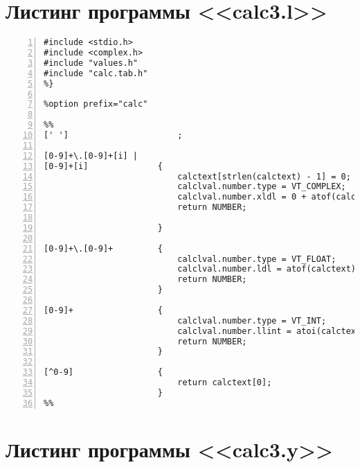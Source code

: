 \documentclass[bachelor, och, coursework, times]{SCWorks}
\begin{document}
\section{Листинг программы <<calc3.l>>}\label{pril-6}

\begin{Verbatim}[fontsize=\small, numbers=left]
%{
#include <stdio.h>
#include <complex.h>
#include "values.h"
#include "calc.tab.h"
%}

%option prefix="calc"

%%
[' ']                      ;

[0-9]+\.[0-9]+[i] | 
[0-9]+[i]              {
                           calctext[strlen(calctext) - 1] = 0;
                           calclval.number.type = VT_COMPLEX;
                           calclval.number.xldl = 0 + atof(calctext) * I;
                           return NUMBER;

                       }

[0-9]+\.[0-9]+         {
                           calclval.number.type = VT_FLOAT;
                           calclval.number.ldl = atof(calctext);
                           return NUMBER;
                       }

[0-9]+                 {
                           calclval.number.type = VT_INT;
                           calclval.number.llint = atoi(calctext);
                           return NUMBER;
                       }

[^0-9]                 {             
                           return calctext[0]; 
                       }
%%
\end{Verbatim}

\section{Листинг программы <<calc3.y>>}\label{pril-7}
\end{document}
